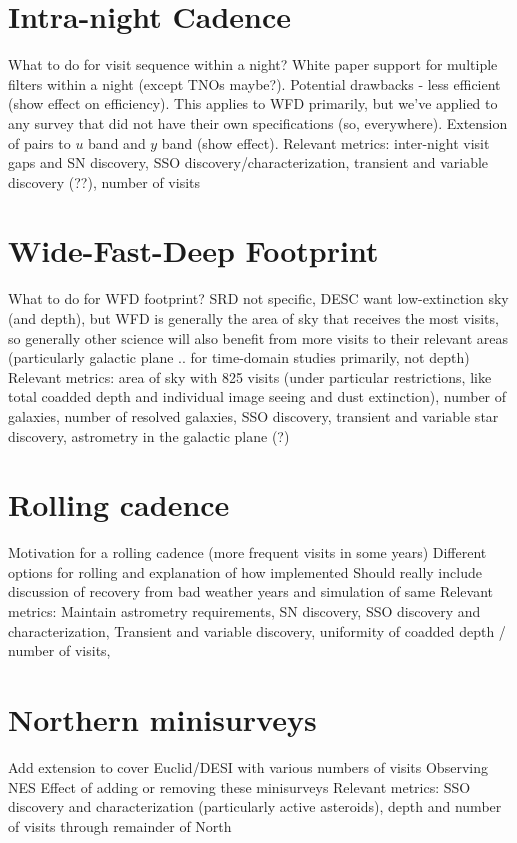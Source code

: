 \section{Intra-night Cadence}
What to do for visit sequence within a night? White paper support for multiple filters within a night (except TNOs maybe?). Potential drawbacks - less efficient (show effect on efficiency). This applies to WFD primarily, but we've applied to any survey that did not have their own specifications (so, everywhere). 
Extension of pairs to $u$ band and $y$ band (show effect). 
Relevant metrics: inter-night visit gaps and SN discovery, SSO discovery/characterization, transient and variable discovery (??), number of visits

\section{Wide-Fast-Deep Footprint}
What to do for WFD footprint? SRD not specific, DESC want low-extinction sky (and depth), but WFD is generally the area of sky that receives the most visits, so generally other science will also benefit from more visits to their relevant areas (particularly galactic plane .. for time-domain studies primarily, not depth)
Relevant metrics: area of sky with 825 visits (under particular restrictions, like total coadded depth and individual image seeing and dust extinction), number of galaxies, number of resolved galaxies, SSO discovery, transient and variable star discovery, astrometry in the galactic plane (?)

\section{Rolling cadence}
Motivation for a rolling cadence (more frequent visits in some years)
Different options for rolling and explanation of how implemented
Should really include discussion of recovery from bad weather years and simulation of same
Relevant metrics: Maintain astrometry requirements, SN discovery, SSO discovery and characterization,  Transient and variable discovery, uniformity of coadded depth / number of visits, 

\section{Northern minisurveys}
Add extension to cover Euclid/DESI with various numbers of visits
Observing NES 
Effect of adding or removing these minisurveys
Relevant metrics: SSO discovery and characterization (particularly active asteroids), depth and number of visits through remainder of North

